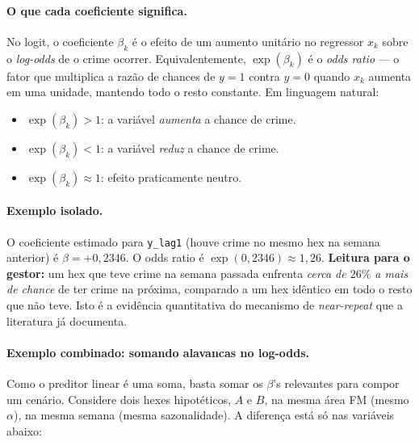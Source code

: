 \documentclass[11pt,a4paper]{article}
\begin{document}
\paragraph{O que cada coeficiente significa.} No logit, o coeficiente
$\beta_k$ é o efeito de um aumento unitário no regressor $x_k$ sobre o
\emph{log-odds} de o crime ocorrer. Equivalentemente, $\exp(\beta_k)$ é
o \emph{odds ratio} --- o fator que multiplica a razão de chances de
$y{=}1$ contra $y{=}0$ quando $x_k$ aumenta em uma unidade, mantendo
todo o resto constante. Em linguagem natural:

\begin{itemize}
  \item $\exp(\beta_k) > 1$: a variável \emph{aumenta} a chance de crime.
  \item $\exp(\beta_k) < 1$: a variável \emph{reduz} a chance de crime.
  \item $\exp(\beta_k) \approx 1$: efeito praticamente neutro.
\end{itemize}

\paragraph{Exemplo isolado.} O coeficiente estimado para
\texttt{y\_lag1} (houve crime no mesmo hex na semana anterior) é
$\beta = +0{,}2346$. O odds ratio é $\exp(0{,}2346) \approx 1{,}26$.
\textbf{Leitura para o gestor:} um hex que teve crime na semana
passada enfrenta \emph{cerca de $26\%$ a mais de chance} de ter crime
na próxima, comparado a um hex idêntico em todo o resto que não teve.
Isto é a evidência quantitativa do mecanismo de \emph{near-repeat}
\cite{JohnsonBowers2004, MohlerEtAl2011} que a literatura já documenta.

\paragraph{Exemplo combinado: somando alavancas no log-odds.} Como o
preditor linear é uma soma, basta somar os $\beta$'s relevantes para
compor um cenário. Considere dois hexes hipotéticos, $A$ e $B$, na
mesma área FM (mesmo $\alpha$), na mesma semana (mesma sazonalidade).
A diferença está só nas variáveis abaixo:
\end{document}
